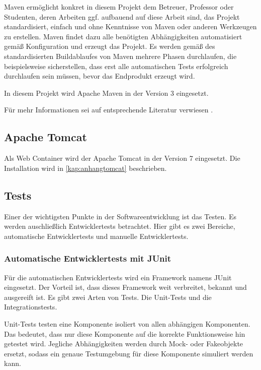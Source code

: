 Maven ermöglicht konkret in diesem Projekt dem Betreuer, Professor oder Studenten, deren Arbeiten ggf. aufbauend auf diese Arbeit sind, das Projekt standardisiert, einfach und ohne Kenntnisse von Maven oder anderen Werkzeugen zu erstellen. Maven findet dazu alle benötigten Abhängigkeiten automatisiert gemäß Konfiguration und erzeugt das Projekt. Es werden gemäß des standardisierten Buildablaufes von Maven mehrere Phasen durchlaufen, die beispielsweise sicherstellen, dass erst alle automatischen Tests erfolgreich durchlaufen sein müssen, bevor das Endprodukt erzeugt wird. 

In diesem Projekt wird Apache Maven in der Version 3 eingesetzt. 

Für mehr Informationen sei auf entsprechende Literatur verwiesen \citep[vgl.][]{Mitp-Verlag}.

\subsection{Apache Tomcat}
Als Web Container wird der \gls{Apache Tomcat} in der Version 7 eingesetzt. Die Installation wird in 
\autoref{kap:anhangtomcat} beschrieben. 
 
\subsection{Tests}

Einer der wichtigsten Punkte in der Softwareentwicklung ist das Testen. Es werden auschließlich Entwicklertests betrachtet. Hier gibt es zwei Bereiche, automatische Entwicklertests und manuelle Entwicklertests. 

\subsubsection{Automatische Entwicklertests mit JUnit}

Für die automatischen Entwicklertests wird ein Framework namens JUnit eingesetzt. Der Vorteil ist, dass dieses Framework weit verbreitet, bekannt und ausgereift ist. 
Es gibt zwei Arten von Tests. Die \glspl{Unit-Test} und die \glspl{Integrationstest}. 

\glspl{Unit-Test} testen eine Komponente isoliert von allen abhängigen Komponenten. Das bedeutet, dass nur diese Komponente auf die korrekte Funktionsweise hin getestet wird. Jegliche Abhängigkeiten werden durch Mock- oder Fakeobjekte ersetzt, sodass ein genaue Testumgebung für diese Komponente simuliert werden kann. 

